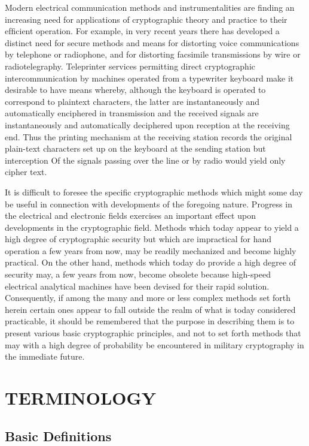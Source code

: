 \mypara Modern electrical communication methods and instrumentalities are
ﬁnding an increasing need for applications of cryptographic theory and
practice to their efﬁcient operation. For example, in very recent years
there has developed a distinct need for secure methods and means for
distorting voice communications by telephone or radiophone, and
for distorting facsimile transmissions by wire or radiotelegraphy. Teleprinter services permitting direct cryptographic intercommunication by
machines operated from a typewriter keyboard make it desirable to have
means whereby, although the keyboard is operated to correspond to plaintext characters, the latter are instantaneously and automatically
enciphered in transmission and the received signals are instantaneously
and automatically deciphered upon reception at the receiving end. Thus
the printing mechanism at the receiving station records the original
plain-text characters set up on the keyboard at the sending station but
interception Of the signals passing over the line or by radio would yield
only cipher text.

\mypara It is difficult to foresee the speciﬁc cryptographic methods which
might some day be useful in connection with developments of the foregoing nature. Progress in the electrical and electronic ﬁelds exercises an
important effect upon developments in the cryptographic ﬁeld. Methods
which today appear to yield a high degree of cryptographic security but
which are impractical for hand operation a few years from now, may be
readily mechanized and become highly practical. On the other hand,
methods which today do provide a high degree of security may, a few
years from now, become obsolete because high-speed electrical analytical
machines have been devised for their rapid solution. Consequently, if
among the many and more or less complex methods set forth herein
certain ones appear to fall outside the realm of what is today considered
practicable, it should be remembered that the purpose in describing them
is to present various basic cryptographic principles, and not to set forth
methods that may with a high degree of probability be encountered in
military cryptography in the immediate future.

\section{TERMINOLOGY}

\subsection{Basic Definitions}

